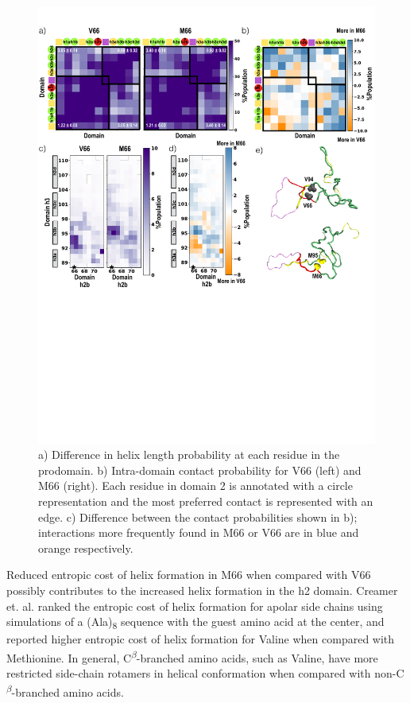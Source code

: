 \documentclass[journal=jacsat,manuscript=article]{achemso}
\begin{document}
\begin{figure}[!ht]
\includegraphics[scale=0.5,width=\textwidth,trim={0 0cm 0 0cm},clip]{../figures/fig4.pdf}

\caption{a) Difference in helix length probability at each residue in the prodomain. b) Intra-domain contact probability for V66 (left) and M66 (right). Each residue in domain 2 is annotated with a circle representation and the most preferred contact is represented with an edge. c) Difference between the contact probabilities shown in b); interactions more frequently found in M66 or V66 are in blue and orange respectively. }

\label{fig4} 
\end{figure}

Reduced entropic cost of helix formation in M66 when compared with V66 possibly contributes to the increased helix formation in the h2 domain. Creamer et. al. ranked the entropic cost of helix formation for apolar side chains using simulations of a (Ala)\textsubscript{8} sequence with the guest amino acid at the center, and reported higher entropic cost of helix formation for Valine when compared with Methionine\cite{Creamer1992}. In general, C\textsuperscript{$\beta$}-branched amino acids, such as Valine, have more restricted side-chain rotamers in helical conformation when compared with non-C\textsuperscript{$\beta$}-branched amino acids.
\end{document}
